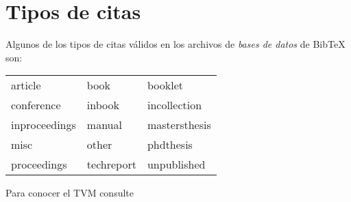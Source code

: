 \documentclass[letterpaper,12pt]{book}
\begin{document}
\section{Tipos de citas}

Algunos de los tipos de citas válidos en los archivos de 
\emph{bases de datos} de Bib\TeX{} son:

\begin{tabular}{lll}
article & book & booklet \\
conference & inbook & incollection \\
inproceedings & manual & mastersthesis \\
misc & other & phdthesis \\
proceedings & techreport & unpublished
\end{tabular}

Para conocer el TVM consulte\cite{spivakCalc}



\end{document}
